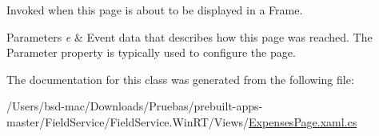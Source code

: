 Invoked when this page is about to be displayed in a Frame. 


\begin{DoxyParams}{Parameters}
{\em e} & Event data that describes how this page was reached. The Parameter property is typically used to configure the page.\\
\hline
\end{DoxyParams}


The documentation for this class was generated from the following file\+:\begin{DoxyCompactItemize}
\item 
/\+Users/bsd-\/mac/\+Downloads/\+Pruebas/prebuilt-\/apps-\/master/\+Field\+Service/\+Field\+Service.\+Win\+R\+T/\+Views/\hyperlink{_expenses_page_8xaml_8cs}{Expenses\+Page.\+xaml.\+cs}\end{DoxyCompactItemize}
